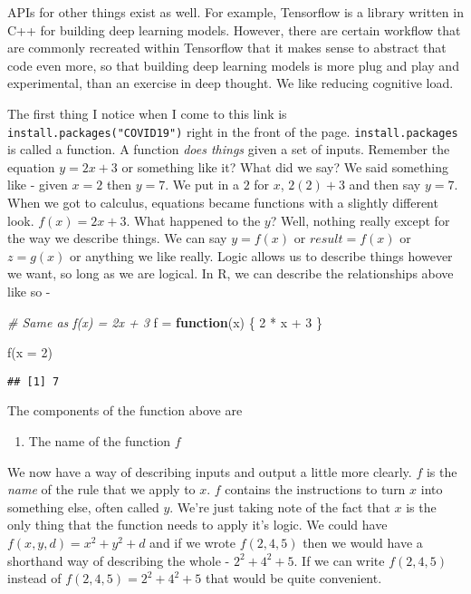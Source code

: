 \documentclass[
]{book}
\newenvironment{Shaded}{\begin{snugshade}}{\end{snugshade}}
\newcommand{\AttributeTok}[1]{\textcolor[rgb]{0.77,0.63,0.00}{#1}}
\newcommand{\CommentTok}[1]{\textcolor[rgb]{0.56,0.35,0.01}{\textit{#1}}}
\newcommand{\ControlFlowTok}[1]{\textcolor[rgb]{0.13,0.29,0.53}{\textbf{#1}}}
\newcommand{\DecValTok}[1]{\textcolor[rgb]{0.00,0.00,0.81}{#1}}
\newcommand{\FunctionTok}[1]{\textcolor[rgb]{0.00,0.00,0.00}{#1}}
\newcommand{\NormalTok}[1]{#1}
\newcommand{\OtherTok}[1]{\textcolor[rgb]{0.56,0.35,0.01}{#1}}
\newcommand{\SpecialCharTok}[1]{\textcolor[rgb]{0.00,0.00,0.00}{#1}}
\providecommand{\tightlist}{%
  \setlength{\itemsep}{0pt}\setlength{\parskip}{0pt}}
\begin{document}
APIs for other things exist as well. For example, Tensorflow is a library written in C++ for building deep learning models. However, there are certain workflow that are commonly recreated within Tensorflow that it makes sense to abstract that code even more, so that building deep learning models is more plug and play and experimental, than an exercise in deep thought. We like reducing cognitive load.

The first thing I notice when I come to this link is \texttt{install.packages("COVID19")} right in the front of the page. \texttt{install.packages} is called a function. A function \emph{does things} given a set of inputs. Remember the equation \(y = 2x + 3\) or something like it? What did we say? We said something like - given \(x=2\) then \(y=7\). We put in a \(2\) for \(x\), \(2(2) + 3\) and then say \(y=7\). When we got to calculus, equations became functions with a slightly different look. \(f(x) = 2x + 3\). What happened to the \(y\)? Well, nothing really except for the way we describe things. We can say \(y=f(x)\) or \(result=f(x)\) or \(z=g(x)\) or anything we like really. Logic allows us to describe things however we want, so long as we are logical. In R, we can describe the relationships above like so -

\begin{Shaded}
\begin{Highlighting}[]
\CommentTok{\# Same as f(x) = 2x + 3}
\NormalTok{f }\OtherTok{=} \ControlFlowTok{function}\NormalTok{(x) \{}
    \DecValTok{2} \SpecialCharTok{*}\NormalTok{ x }\SpecialCharTok{+} \DecValTok{3}
\NormalTok{\}}

\FunctionTok{f}\NormalTok{(}\AttributeTok{x =} \DecValTok{2}\NormalTok{)}
\end{Highlighting}
\end{Shaded}

\begin{verbatim}
## [1] 7
\end{verbatim}

The components of the function above are

\begin{enumerate}
\def\labelenumi{\arabic{enumi}.}
\tightlist
\item
  The name of the function \(f\)
\end{enumerate}

We now have a way of describing inputs and output a little more clearly. \(f\) is the \emph{name} of the rule that we apply to \(x\). \(f\) contains the instructions to turn \(x\) into something else, often called \(y\). We're just taking note of the fact that \(x\) is the only thing that the function needs to apply it's logic. We could have \(f(x, y, d)= x^2 + y^2 + d\) and if we wrote \(f(2, 4, 5)\) then we would have a shorthand way of describing the whole - \(2^2+4^2+5\). If we can write \(f(2, 4, 5)\) instead of \(f(2, 4, 5)=2^2+4^2+5\) that would be quite convenient.
\end{document}

